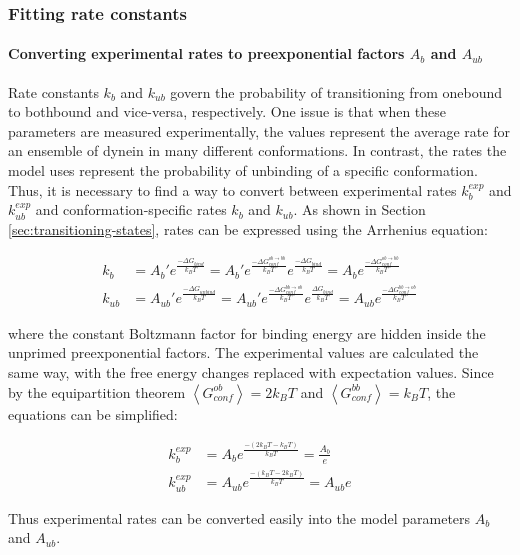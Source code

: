 \documentclass[10pt]{article} %
\begin{document}
\subsubsection{Fitting rate constants}
\paragraph{Converting experimental rates to preexponential factors $A_b$ and $A_{ub}$}
Rate constants $k_b$ and $k_{ub}$ govern the probability of transitioning from onebound to bothbound and vice-versa, respectively. One issue is that when these parameters are measured experimentally, the values represent the average rate for an ensemble of dynein in many different conformations. In contrast, the rates the model uses represent the probability of unbinding of a specific conformation. Thus, it is necessary to find a way to convert between experimental rates $k_b^{exp}$ and $k_{ub}^{exp}$ and conformation-specific rates $k_b$ and $k_{ub}$. As shown in Section \ref{sec:transitioning-states}, rates can be expressed using the Arrhenius equation:

\begin{align*}
  k_b &= A_b'e^{\frac{-\Delta G_{bind}}{k_BT}} = A_b'e^{\frac{-\Delta G_{conf}^{ob\rightarrow bb}}{k_BT}}e^{\frac{-\Delta G_{bind}}{k_BT}} = A_be^{\frac{-\Delta G_{conf}^{ob\rightarrow bb}}{k_BT}}\\
  k_{ub} &= A_{ub}'e^{\frac{-\Delta G_{unbind}}{k_BT}} = A_{ub}'e^{\frac{-\Delta G_{conf}^{bb\rightarrow ob}}{k_BT}}e^{\frac{\Delta G_{bind}}{k_BT}} = A_{ub}e^{\frac{-\Delta G_{conf}^{bb\rightarrow ob}}{k_BT}}
\end{align*}

where the constant Boltzmann factor for binding energy are hidden inside the unprimed preexponential factors. The experimental values are calculated the same way, with the free energy changes replaced with expectation values. Since by the equipartition theorem $\left<G_{conf}^{ob}\right> = 2k_BT$ and $\left<G_{conf}^{bb}\right> = k_BT$, the equations can be simplified:

\begin{align*}
  k_b^{exp} &= A_be^{\frac{-\left(2k_BT - k_BT\right)}{k_BT}} = \frac{A_b}{e}\\
  k_{ub}^{exp} &= A_{ub}e^{\frac{-\left(k_BT-2k_BT\right)}{k_BT}} = A_{ub}e
\end{align*}

Thus experimental rates can be converted easily into the model parameters $A_b$ and $A_{ub}$.
\end{document}

